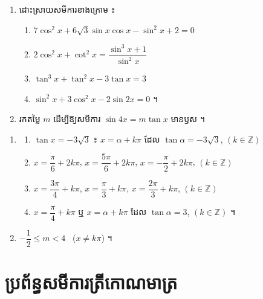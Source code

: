 \begin{pro}
\begin{enumerate}[1]
  \item ដោះស្រាយសមីការខាងក្រោម ៖
  \begin{enumerate}[a]
    \item $7\cos^2 x + 6\sqrt{3}\sin x\cos x - \sin^2 x + 2 = 0$
    \item $2\cos^2 x + \cot^2 x = \dfrac{\sin^3 x + 1}{\sin^2 x}$
    \item $\tan^3 x + \tan^2 x - 3\tan x = 3$
    \item $\sin^2 x + 3\cos^2 x - 2\sin 2x = 0$ ។
  \end{enumerate}
  \item រកតម្លៃ $m$ ដើម្បីឱ្យសមីការ $\sin 4x = m\tan x$ មានឫស ។
\end{enumerate}
\ans
\begin{enumerate}[1]
  \item
  \begin{enumerate}[a]
    \item $\tan x = -3\sqrt{3}$ ៖ $x = \alpha + k\pi$ ដែល $\tan\alpha = -3\sqrt{3}$, $(k \in \mathbb{Z})$
    \item $x = \dfrac{\pi}{6} + 2k\pi$, $x = \dfrac{5\pi}{6} + 2k\pi$, $x = -\dfrac{\pi}{2} + 2k\pi$, $(k \in \mathbb{Z})$
    \item $x = \dfrac{3\pi}{4} + k\pi$, $x = \dfrac{\pi}{3} + k\pi$, $x = \dfrac{2\pi}{3} + k\pi$, $(k \in \mathbb{Z})$
    \item $x = \dfrac{\pi}{4} + k\pi$ ឬ $x = \alpha + k\pi$ ដែល $\tan\alpha = 3$, $(k \in \mathbb{Z})$ ។
  \end{enumerate}
  \item $-\dfrac{1}{2} \le m < 4$ \ ($x \ne k\pi$) ។
\end{enumerate}
\end{pro}

\section{ប្រព័ន្ធសមីការត្រីកោណមាត្រ}

